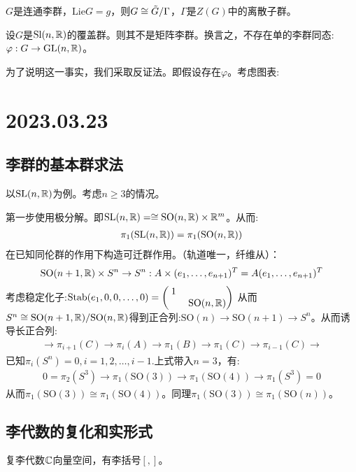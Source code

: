 \begin{corollary}
    $G$是连通李群，$\mathrm{Lie}G=g$，则$G \cong \tilde{G}/\Gamma$，$\Gamma$是$Z(G)$中的离散子群。


\end{corollary}
\begin{example}
    设$G$是$\mathrm{Sl}(n,\mathbb{R})$的覆盖群。则其不是矩阵李群。换言之，不存在单的李群同态:$\varphi:G \to \mathrm{GL}(n,\mathbb{R})$。 

    为了说明这一事实，我们采取反证法。即假设存在$\varphi$。考虑图表:
    
\end{example}
\chapter{2023.03.23}
\section{李群的基本群求法}
以$\mathrm{SL}(n,\mathbb{R})$为例。考虑$n \geq 3$的情况。

第一步使用极分解。即$\mathrm{SL}(n,\mathbb{R})=\cong \mathrm{SO}(n,\mathbb{R})\times \mathbb{R}^m$。从而:
\begin{align}
    \pi_1(\mathrm{SL}(n,\mathbb{R}))=\pi_1(\mathrm{SO}(n,\mathbb{R}))
\end{align}
在已知同伦群的作用下构造可迁群作用。（轨道唯一，纤维从）：
\begin{align}
    \mathrm{SO}(n+1,\mathbb{R})\times S^n \to S^n: A \times (e_1,\dots,e_{n+1})^T=A(e_1,\dots,e_{n+1})^T
\end{align}
考虑稳定化子:$\mathrm{Stab}(e_1,0,0,\dots,0)=\begin{pmatrix}
    1& \quad \\ \quad &\mathrm{SO}(n,\mathbb{R})
\end{pmatrix}$
从而$S^n\cong \mathrm{SO}(n+1,\mathbb{R})/\mathrm{SO}(n,\mathbb{R})$得到正合列:$\mathrm{SO}(n) \to \mathrm{SO}(n+1) \to S^n$。从而诱导长正合列:
\begin{align}
    \to \pi_{i+1}(C) \to \pi_i(A)\to \pi_1(B) \to \pi_1(C) \to \pi_{i-1}(C) \to
\end{align}
已知$\pi_i(S^n)=0,i=1,2,\dots,i-1$.上式带入$n=3$，有:
\begin{align}
    0=\pi_2(S^3) \to \pi_1(\mathrm{SO}(3)) \to \pi_1(\mathrm{SO}(4)) \to \pi_1(S^3)=0
\end{align}
从而$\pi_1(\mathrm{SO}(3))\cong \pi_1(\mathrm{SO}(4))$。同理$\pi_1(\mathrm{SO}(3)) \cong \pi_1(\mathrm{SO}(n))$。

\section{李代数的复化和实形式}
复李代数$\mathbb{C}$向量空间，有李括号$[,]$。

